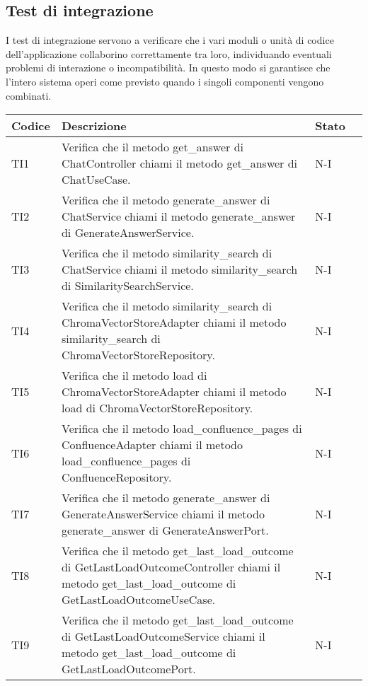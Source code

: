 \newpage

\subsection{Test di integrazione}
\label{sec:Test di integrazione}
I test di integrazione servono a verificare che i vari moduli o unità di codice dell’applicazione collaborino correttamente tra loro, individuando eventuali problemi di interazione o incompatibilità. In questo modo si garantisce che l’intero sistema operi come previsto quando i singoli componenti vengono combinati.\\
\begin{table}[h!]
    \centering
    \renewcommand{\arraystretch}{1.5}
    \begin{tabularx}{\textwidth}{|p{}|X|p{}|p{}|}\hline
    \rowcolor[HTML]{FFD700}
    \textbf{Codice} & \textbf{Descrizione}  & \textbf{Stato} \\ \hline
    TI1 & Verifica che il metodo get\_answer di ChatController chiami il metodo get\_answer di ChatUseCase. &  N-I \\ \hline
    TI2 & Verifica che il metodo generate\_answer di ChatService chiami il metodo generate\_answer di GenerateAnswerService. &  N-I \\ \hline
    TI3 & Verifica che il metodo similarity\_search di ChatService chiami il metodo similarity\_search di SimilaritySearchService. &  N-I \\ \hline
    TI4 & Verifica che il metodo similarity\_search di ChromaVectorStoreAdapter chiami il metodo similarity\_search di ChromaVectorStoreRepository. &  N-I \\ \hline
    TI5 & Verifica che il metodo load di ChromaVectorStoreAdapter chiami il metodo load di ChromaVectorStoreRepository. &  N-I \\ \hline
    TI6 & Verifica che il metodo load\_confluence\_pages di ConfluenceAdapter chiami il metodo load\_confluence\_pages di ConfluenceRepository. &  N-I \\ \hline
    TI7 & Verifica che il metodo generate\_answer di GenerateAnswerService chiami il metodo generate\_answer di GenerateAnswerPort. &  N-I \\ \hline
    TI8 & Verifica che il metodo get\_last\_load\_outcome di GetLastLoadOutcomeController chiami il metodo get\_last\_load\_outcome di GetLastLoadOutcomeUseCase. &  N-I \\ \hline
    TI9 & Verifica che il metodo get\_last\_load\_outcome di GetLastLoadOutcomeService chiami il metodo get\_last\_load\_outcome di GetLastLoadOutcomePort. &  N-I \\ \hline

\end{tabularx}
\end{table}
